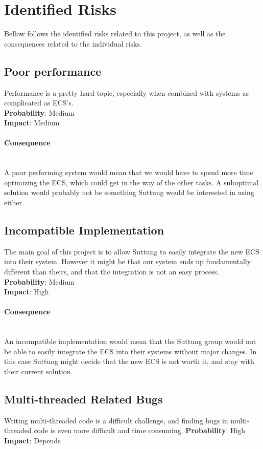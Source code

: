 \newcommand{\ptparagraph}[1]{\paragraph{#1}\mbox{}\\}
\newcommand{\ptsubparagraph}[1]{\mbox{}\\\textbf{#1}\mbox{}\\}

\section*{Identified Risks}
Bellow follows the identified risks related to this project, 
as well as the consequences related to the individual risks.

\subsection*{Poor performance}
Performance is a pretty hard topic, especially when combined with
systems as complicated as ECS's.\\
\textbf{Probability}: Medium\\
\textbf{Impact}: Medium

\ptparagraph{Consequence}
A poor performing system would mean that we would have to spend more time
optimizing the ECS, which could get in the way of the other tasks.
A suboptimal solution would probably not be something Suttung would be interested
in using either.

\subsection*{Incompatible Implementation}
The main goal of this project is to allow Suttung to easily integrate the new ECS
into their system. 
However it might be that our system ends up fundamentally different than theirs,
and that the integration is not an easy process.
\textbf{Probability}: Medium\\
\textbf{Impact}: High

\ptparagraph{Consequence} 
An incompatible implementation would mean that the Suttung group would not be able to
easily integrate the ECS into their systems without major changes. 
In this case Suttung might decide that the new ECS is not worth it,
and stay with their current solution.

\subsection*{Multi-threaded Related Bugs}
Writing multi-threaded code is a difficult challenge, and finding bugs in multi-threaded
code is even more difficult and time consuming.
\textbf{Probability}: High\\
\textbf{Impact}: Depends

